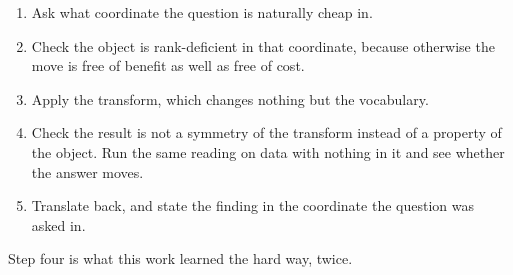 \begin{enumerate}
  \item Ask what coordinate the question is naturally cheap in.
  \item Check the object is rank-deficient in that coordinate, because otherwise the move is free of benefit as well as free of cost.
  \item Apply the transform, which changes nothing but the vocabulary.
  \item Check the result is not a symmetry of the transform instead of a property of the object. Run the same reading on data with nothing in it and see whether the answer moves.
  \item Translate back, and state the finding in the coordinate the question was asked in.
\end{enumerate}

Step four is what this work learned the hard way, twice.
